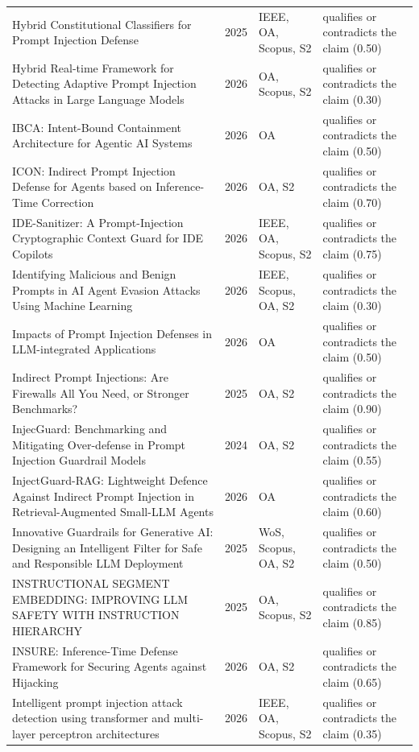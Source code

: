 \begin{longtable}{@{}%
  >{\raggedright\arraybackslash}p{}c%
  >{\raggedright\arraybackslash}p{}%
  >{\raggedright\arraybackslash}p{}@{}}
Hybrid Constitutional Classifiers for Prompt Injection Defense & 2025 & IEEE, OA, Scopus, S2 & qualifies or contradicts the claim (0.50) \\
Hybrid Real-time Framework for Detecting Adaptive Prompt Injection Attacks in Large Language Models & 2026 & OA, Scopus, S2 & qualifies or contradicts the claim (0.30) \\
IBCA: Intent-Bound Containment Architecture for Agentic AI Systems & 2026 & OA & qualifies or contradicts the claim (0.50) \\
ICON: Indirect Prompt Injection Defense for Agents based on Inference-Time Correction & 2026 & OA, S2 & qualifies or contradicts the claim (0.70) \\
IDE-Sanitizer: A Prompt-Injection Cryptographic Context Guard for IDE Copilots & 2026 & IEEE, OA, Scopus, S2 & qualifies or contradicts the claim (0.75) \\
Identifying Malicious and Benign Prompts in AI Agent Evasion Attacks Using Machine Learning & 2026 & IEEE, Scopus, OA, S2 & qualifies or contradicts the claim (0.30) \\
Impacts of Prompt Injection Defenses in LLM-integrated Applications & 2026 & OA & qualifies or contradicts the claim (0.50) \\
Indirect Prompt Injections: Are Firewalls All You Need, or Stronger Benchmarks? & 2025 & OA, S2 & qualifies or contradicts the claim (0.90) \\
InjecGuard: Benchmarking and Mitigating Over-defense in Prompt Injection Guardrail Models & 2024 & OA, S2 & qualifies or contradicts the claim (0.55) \\
InjectGuard-RAG: Lightweight Defence Against Indirect Prompt Injection in Retrieval-Augmented Small-LLM Agents & 2026 & OA & qualifies or contradicts the claim (0.60) \\
Innovative Guardrails for Generative AI: Designing an Intelligent Filter for Safe and Responsible LLM Deployment & 2025 & WoS, Scopus, OA, S2 & qualifies or contradicts the claim (0.50) \\
INSTRUCTIONAL SEGMENT EMBEDDING: IMPROVING LLM SAFETY WITH INSTRUCTION HIERARCHY & 2025 & OA, Scopus, S2 & qualifies or contradicts the claim (0.85) \\
INSURE: Inference-Time Defense Framework for Securing Agents against Hijacking & 2026 & OA, S2 & qualifies or contradicts the claim (0.65) \\
Intelligent prompt injection attack detection using transformer and multi-layer perceptron architectures & 2026 & IEEE, OA, Scopus, S2 & qualifies or contradicts the claim (0.35) \\

\end{longtable}
